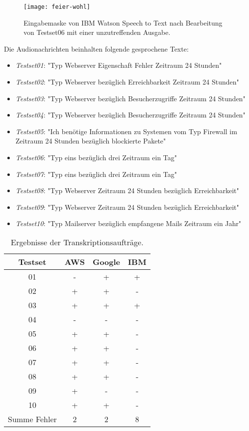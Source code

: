 \begin{figure}[h!]
\centering
\texttt{[image: feier-wohl]}
\caption{Eingabemaske von IBM Watson Speech to Text nach Bearbeitung von Testset06 mit einer unzutreffenden Ausgabe.}
\label{fig:feier-wohl}
\end{figure}

Die Audionachrichten beinhalten folgende gesprochene Texte:
\begin{itemize}
\item \textit{Testset01}: "Typ Webserver Eigenschaft Fehler Zeitraum 24 Stunden"
\item \textit{Testset02}: "Typ Webserver bezüglich Erreichbarkeit Zeitraum 24 Stunden"
\item \textit{Testset03}: "Typ Webserver bezüglich Besucherzugriffe Zeitraum 24 Stunden"
\item \textit{Testset04}: "Typ Webserver bezüglich Besucherzugriffe Zeitraum 24 Stunden"
\item \textit{Testset05}: "Ich benötige Informationen zu Systemen vom Typ Firewall im Zeitraum 24 Stunden bezüglich blockierte Pakete"
\item \textit{Testset06}: "Typ eins bezüglich drei Zeitraum ein Tag"
\item \textit{Testset07}: "Typ eins bezüglich drei Zeitraum ein Tag"
\item \textit{Testset08}: "Typ Webserver Zeitraum 24 Stunden bezüglich Erreichbarkeit"
\item \textit{Testset09}: "Typ Webserver Zeitraum 24 Stunden bezüglich Erreichbarkeit"
\item \textit{Testset10}: "Typ Mailserver bezüglich empfangene Mails Zeitraum ein Jahr"
\end{itemize}

\begin{table}[hb!]
\centering
\begin{tabular}{c|c|c|c}
Testset 		& AWS	& Google		& IBM \\
\hline
01			& -		& +			& + \\
02			& +		& +			& - \\
03			& +		& +			& + \\
04			& -		& -			& - \\
05			& +		& +			& - \\
06			& +		& +			& - \\
07			& +		& +			& - \\
08			& +		& +			& - \\
09			& +		& -			& - \\
10			& +		& +			& - \\
\hline
Summe Fehler	& 2		& 2			& 8
\end{tabular}
\caption{Ergebnisse der Transkriptionsaufträge.}
\label{tab:erg-transkript}
\end{table}

